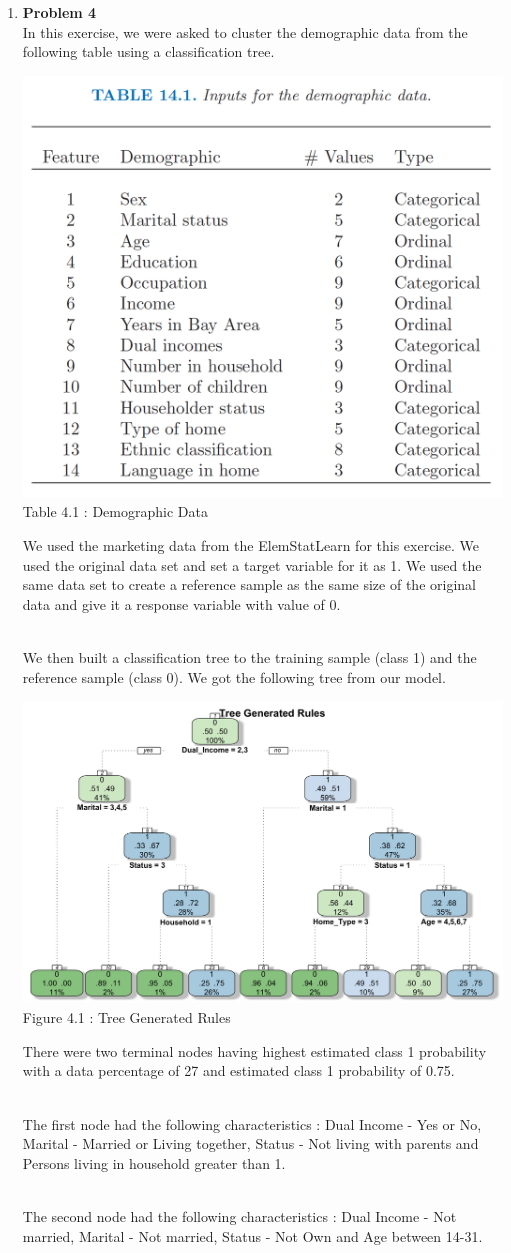 \documentclass[11pt]{article}
\begin{document}
\begin{enumerate}
\newpage
\item\textbf{Problem 4} 
\\
In this exercise, we were asked to cluster the demographic data from the following table using a classification tree.
\begin{center}
    \includegraphics[height=0.4\textwidth]{sshhs.png}
    \\\footnotesize Table 4.1 : Demographic Data 
\end{center}

We used the marketing data from the ElemStatLearn for this exercise. We used the original data set and set a target variable for it as 1. We used the same data set to create a reference sample as the same size of the original data and give it a response variable with value of 0.

\\We then built a classification tree to the training sample (class 1) and the reference sample (class 0). We got the following tree from our model.

\begin{center}
    \includegraphics[height=0.5\textwidth]{fghf.png}
    \\\footnotesize Figure 4.1 : Tree Generated Rules 
\end{center}

There were two terminal nodes having highest estimated class 1 probability with a data percentage of 27 and estimated class 1 probability of 0.75. 

\\The first node had the following characteristics : Dual Income - Yes or No, Marital - Married or Living together, Status - Not living with parents and Persons living in household greater than 1.

\\The second node had the following characteristics : Dual Income - Not married, Marital - Not married, Status - Not Own and Age between 14-31.

\end{enumerate}
\end{document}
